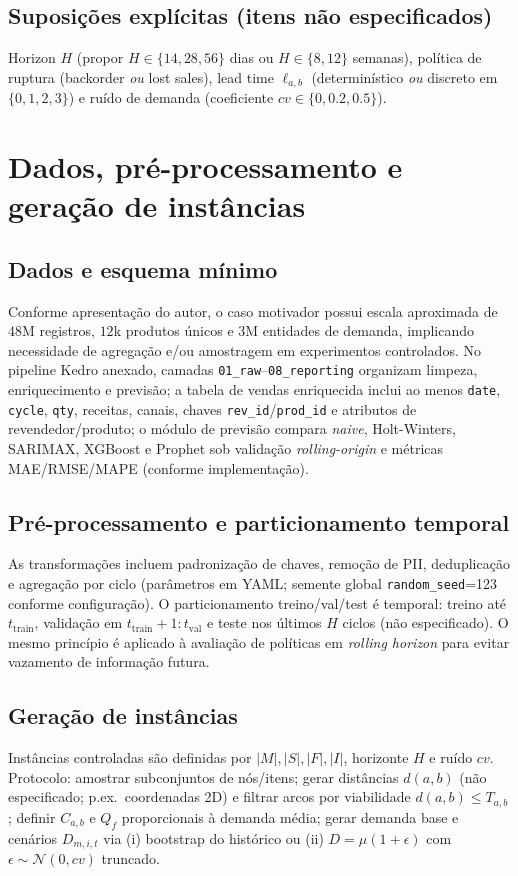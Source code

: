 \subsection*{Suposições explícitas (itens não especificados)}
Horizon \(H\) (propor \(H\in\{14,28,56\}\) dias ou \(H\in\{8,12\}\) semanas), política de ruptura (backorder \emph{ou} lost sales), lead time \(\ell_{a,b}\) (determinístico \emph{ou} discreto em \(\{0,1,2,3\}\)) e ruído de demanda (coeficiente \(cv\in\{0,0.2,0.5\}\)). \cite{Axsater2006InventoryControl,BirgeLouveaux2011StochasticProgramming}

\section{Dados, pré-processamento e geração de instâncias}
\subsection{Dados e esquema mínimo}
Conforme apresentação do autor, o caso motivador possui escala aproximada de \(48\)M registros, \(12\)k produtos únicos e \(3\)M entidades de demanda, implicando necessidade de agregação e/ou amostragem em experimentos controlados. No pipeline Kedro anexado, camadas \texttt{01\_raw}--\texttt{08\_reporting} organizam limpeza, enriquecimento e previsão; a tabela de vendas enriquecida inclui ao menos \texttt{date}, \texttt{cycle}, \texttt{qty}, receitas, canais, chaves \texttt{rev\_id}/\texttt{prod\_id} e atributos de revendedor/produto; o módulo de previsão compara \emph{naive}, Holt-Winters, SARIMAX, XGBoost e Prophet sob validação \emph{rolling-origin} e métricas MAE/RMSE/MAPE (conforme implementação). \cite{Nasseri2023RetailDemandPrediction}

\subsection{Pré-processamento e particionamento temporal}
As transformações incluem padronização de chaves, remoção de PII, deduplicação e agregação por ciclo (parâmetros em YAML; semente global \texttt{random\_seed}=123 conforme configuração). O particionamento treino/val/test é temporal: treino até \(t_{\mathrm{train}}\), validação em \(t_{\mathrm{train}}{+}1{:}t_{\mathrm{val}}\) e teste nos últimos \(H\) ciclos (não especificado). O mesmo princípio é aplicado à avaliação de políticas em \emph{rolling horizon} para evitar vazamento de informação futura.

\subsection{Geração de instâncias}
Instâncias controladas são definidas por \(|M|,|S|,|F|,|I|\), horizonte \(H\) e ruído \(cv\). Protocolo: amostrar subconjuntos de nós/itens; gerar distâncias \(d(a,b)\) (não especificado; p.ex.\ coordenadas 2D) e filtrar arcos por viabilidade \(d(a,b)\le T_{a,b}\); definir \(C_{a,b}\) e \(Q_f\) proporcionais à demanda média; gerar demanda base e cenários \(D_{m,i,t}\) via (i) bootstrap do histórico ou (ii) \(D=\mu(1+\epsilon)\) com \(\epsilon\sim \mathcal{N}(0,cv)\) truncado. \cite{AhujaMagnantiOrlin1993NetworkFlows,Shapiro2001ModelingSupplyChain}

